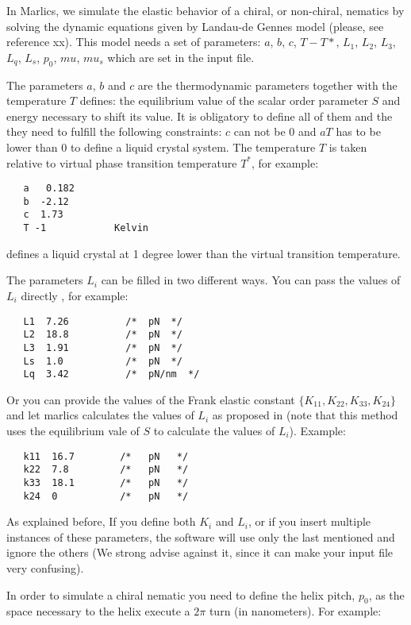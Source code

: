 \documentclass{article}
\begin{document}
In Marlics, we simulate the elastic behavior of a chiral, or non-chiral, nematics by solving the dynamic equations given by Landau-de Gennes 
model (please, see reference xx). This model needs a set of parameters: $a$, $b$, $c$, $T-T*$, $L_1$, $L_2$, $L_3$, $L_q$, $L_s$, $p_0$, $mu$, $mu_s$ which are set in the input file.

The parameters $a$, $b$ and $c$ are the thermodynamic parameters
together with the temperature $T$ defines: the equilibrium value of
the scalar order parameter $S$ and energy necessary to shift its
value. It is obligatory to define all of them and the they need to
fulfill the following constraints: $c$ can not be 0 and $a T$ has to
be lower than 0 to define a liquid crystal system. The temperature $T$
is taken relative to virtual phase transition temperature $T^*$, for
example:
\begin{lstlisting}	
   a   0.182
   b  -2.12
   c  1.73
   T -1            Kelvin
\end{lstlisting}
defines a liquid crystal at 1 degree lower than the virtual transition
temperature.

The parameters $L_i$ can be filled in two different ways. You can pass the values of $L_i$ directly , for example:
\begin{lstlisting}
   L1  7.26          /*  pN  */
   L2  18.8          /*  pN  */
   L3  1.91          /*  pN  */
   Ls  1.0           /*  pN  */
   Lq  3.42          /*  pN/nm  */
\end{lstlisting}


Or you can provide the values of the Frank elastic constant
$\lbrace K_{11}, K_{22}, K_{33}, K_{24} \rbrace$ and let marlics
calculates the values of $L_i$ as proposed in \cite{} (note that this
method uses the equilibrium vale of $S$ to calculate the values of
$L_i$). Example:

\begin{lstlisting}
   k11  16.7        /*   pN   */
   k22  7.8         /*   pN   */
   k33  18.1        /*   pN   */
   k24  0           /*   pN   */ 
\end{lstlisting}

As explained before, If you define both $K_i$ and $L_i$, or if you
insert multiple instances of these parameters, the software will use
only the last mentioned and ignore the others (We strong advise
against it, since it can make your input file very confusing).

In order to simulate a chiral nematic you need to define the helix
pitch, $p_0$, as the space necessary to the helix execute a $2 \pi$
turn (in nanometers). For example:
\end{document}
